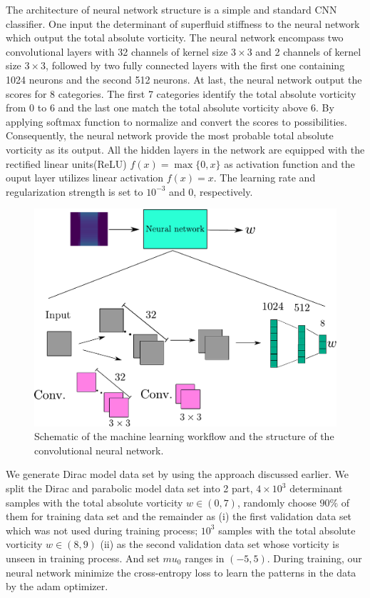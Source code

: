 \documentclass{article}
\begin{document}
The architecture of neural network structure is a simple and standard CNN classifier. One input the determinant of superfluid stiffness to the neural network which output the total absolute vorticity. The neural network encompass two convolutional layers with 32 channels of kernel size $ 3 \times 3 $ and 2 channels of kernel size $ 3 \times 3 $, followed by two fully connected layers with the first one containing 1024 neurons and the second 512 neurons. At last, the neural network output the scores for 8 categories. The first 7 categories identify the total absolute vorticity from $ 0 $ to $ 6 $ and the last one match the total absolute vorticity above $ 6 $. By applying softmax function to normalize and convert the scores to possibilities. Consequently, the neural network provide the most probable total absolute vorticity as its output. All the hidden layers in the network are equipped with the rectified linear units(ReLU) $ f(x) =\max\{0,x\} $ as activation function and the ouput layer utilizes linear activation $ f(x)=x $. The learning rate and regularization strength is set to $ 10^{-3}  $ and $ 0 $, respectively.
\begin{figure}[H]
    \centering
    \includegraphics[width=1\textwidth]{Neural network.pdf}
    \caption{Schematic of the machine learning workflow and the structure of the convolutional neural network.}
    \label{fig: Neural network}
\end{figure}

We generate Dirac model data set by using the approach discussed earlier. We split the Dirac and parabolic model data set into 2 part, $ 4 \times 10^3 $ determinant samples with the total absolute vorticity $ w \in \left(0,7\right) $, randomly choose $ 90\% $ of them for training data set and the remainder as (i) the first validation data set which was not used during training process; $ 10^3 $ samples with the total absolute vorticity $ w \in \left(8,9\right) $ (ii) as the second validation data set whose vorticity is unseen in training process. And set $ mu_0 $ ranges in $ \left(-5,5\right) $. During training, our neural network minimize the cross-entropy loss\cite{hinton1995wake} to learn the patterns in the data by the adam optimizer\cite{kingma2014adam}. 
\end{document}
